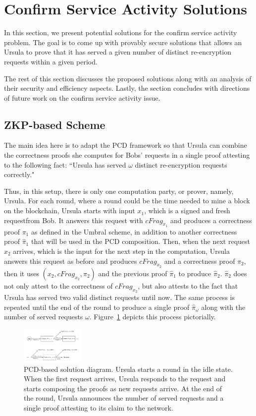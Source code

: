 \section{Confirm Service Activity Solutions}
\label{confirm-service-activity}
In this section, we present potential solutions for the confirm service activity problem. The goal is to come up with provably secure solutions that allows an Ursula to prove that it has served a given number of distinct re-encryption requests within a given period. 


The rest of this section discusses the proposed solutions along with an analysis of their security and efficiency aspects. Lastly, the section concludes with directions of future work on the confirm service activity issue.


\subsection{ZKP-based Scheme}
The main idea here is to adapt the PCD framework so that Ursula can combine the correctness proofs she computes for Bobs' requests in a single proof attesting to the following fact: ``Ursula has served $\omega$ distinct re-encryption requests correctly." 


Thus, in this setup, there is only one computation party, or prover, namely, Ursula. For each round, where a round could be the time needed to mine a block on the blockchain, Ursula starts with input $x_1$, which is a signed and fresh requestfrom Bob. It answers this request with $cFrag_{x_1}$ and produces a correctness proof $\pi_1$ as defined in the Umbral scheme, in addition to another correctness proof $\hat{\pi}_1$ that will be used in the PCD composition. Then, when the next request $x_2$ arrives, which is the input for the next step in the computation, Ursula answers this request as before and produces $cFrag_{x_2}$ and a correctness proof $\pi_2$, then it uses $(x_2, cFrag_{x_2}, \pi_2)$ and the previous proof $\hat{\pi}_1$ to produce $\hat{\pi}_2$. $\hat{\pi}_2$ does not only attest to the correctness of $cFrag_{x_2}$, but also attests to the fact that Ursula has served two valid distinct requests until now. The same process is repeated until the end of the round to produce a single proof $\hat{\pi}_{\omega}$ along with the number of served requests $\omega$. Figure~\ref{pcd-based-sol} depicts 
this process pictorially.


\begin{figure}[h!]
\centerline{
\includegraphics[height= 0.7in, width = 1.0\columnwidth]{figures/pcd-based-sol.pdf}}
\caption{PCD-based solution diagram. Ursula starts a round in the idle state. When the first request arrives, Ursula responds to the request and starts composing the proofs as new requests arrive. At the end of the round, Ursula announces the number of served requests and a single proof attesting to its claim to the network. }
\label{pcd-based-sol}
\end{figure}


